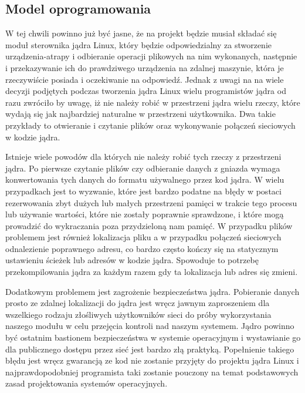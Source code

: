 \documentclass[10pt]{article}
\begin{document}
\subsection{Model oprogramowania}
\label{softmodel}

W tej chwili powinno już być jasne, że na projekt będzie musiał składać się moduł sterownika jądra Linux, który będzie odpowiedzialny za stworzenie urządzenia-atrapy i odbieranie operacji plikowych na nim wykonanych, następnie i przekazywanie ich do prawdziwego urządzenia na zdalnej maszynie, która je rzeczywiście posiada i oczekiwanie na odpowiedź. Jednak z uwagi na na wiele decyzji podjętych podczas tworzenia jądra Linux wielu programistów jądra od razu zwróciło by uwagę, iż nie należy robić w przestrzeni jądra wielu rzeczy, które wydają się jak najbardziej naturalne w przestrzeni użytkownika. Dwa takie przykłady to otwieranie i czytanie plików oraz wykonywanie połączeń sieciowych w kodzie jądra.

Istnieje wiele powodów dla których nie należy robić tych rzeczy z przestrzeni jądra. Po pierwsze czytanie plików czy odbieranie danych z gniazda wymaga konwertowania tych danych do formatu używalnego przez kod jądra. W wielu przypadkach jest to wyzwanie, które jest bardzo podatne na błędy w postaci rezerwowania zbyt dużych lub małych przestrzeni pamięci w trakcie tego procesu lub używanie wartości, które nie zostały poprawnie sprawdzone, i które mogą prowadzić do wykraczania poza przydzieloną nam pamięć. W przypadku plików problemem jest również lokalizacja pliku a w przypadku połączeń sieciowych odnalezienie poprawnego adresu, co bardzo często kończy się na statycznym ustawieniu ścieżek lub adresów w kodzie jądra. Spowoduje to potrzebę przekompilowania jądra za każdym razem gdy ta lokalizacja lub adres się zmieni.

Dodatkowym problemem jest zagrożenie bezpieczeństwa jądra. Pobieranie danych prosto ze zdalnej lokalizacji do jądra jest wręcz jawnym zaproszeniem dla wszelkiego rodzaju złośliwych użytkowników sieci do próby wykorzystania naszego modułu w celu przejęcia kontroli nad naszym systemem. Jądro powinno być ostatnim bastionem bezpieczeństwa w systemie operacyjnym i wystawianie go dla publicznego dostępu przez sieć jest bardzo złą praktyką. Popełnienie takiego błędu jest wręcz gwarancją ze kod nie zostanie przyjęty do projektu jądra Linux i najprawdopodobniej programista taki zostanie pouczony na temat podstawowych zasad projektowania systemów operacyjnych.
\end{document}
